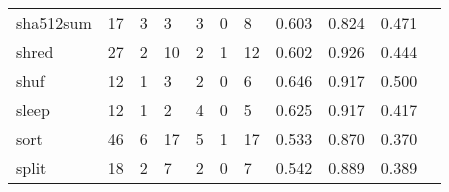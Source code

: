 \begin{longtable}{lp{1.20cm}p{1.20cm}p{1.20cm}p{1.20cm}p{1.20cm}p{1.20cm}p{1.20cm}p{1.20cm}p{1.20cm}p{1.20cm}}
sha512sum &                                    17 &                                                  3 &                                                  3 &                                                  3 &                                                  0 &                                                  8 &                                         0.603 &                                              0.824 &                                              0.471 \\
shred     &                                    27 &                                                  2 &                                                 10 &                                                  2 &                                                  1 &                                                 12 &                                         0.602 &                                              0.926 &                                              0.444 \\
shuf      &                                    12 &                                                  1 &                                                  3 &                                                  2 &                                                  0 &                                                  6 &                                         0.646 &                                              0.917 &                                              0.500 \\
sleep     &                                    12 &                                                  1 &                                                  2 &                                                  4 &                                                  0 &                                                  5 &                                         0.625 &                                              0.917 &                                              0.417 \\
sort      &                                    46 &                                                  6 &                                                 17 &                                                  5 &                                                  1 &                                                 17 &                                         0.533 &                                              0.870 &                                              0.370 \\
split     &                                    18 &                                                  2 &                                                  7 &                                                  2 &                                                  0 &                                                  7 &                                         0.542 &                                              0.889 &                                              0.389 \\

\end{longtable}
